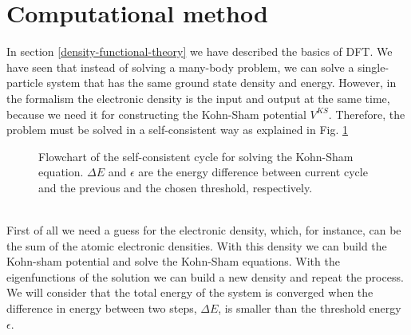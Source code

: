 \section{Computational method}

In section \ref{density-functional-theory} we have described the basics of DFT. We have seen that instead of solving a many-body problem, we can solve a single-particle system that has the same ground state density and 
energy. However, in the formalism the electronic density is the input and output at the same time, because we need it for constructing the Kohn-Sham potential $V^{KS}$. Therefore, the problem must be solved in a 
self-consistent way as explained in Fig. \ref{self-consistent-cycle} 
\begin{figure}[h]
\begin{center}
\end{center}
\caption[DFT self-consistent cycle]{Flowchart of the self-consistent cycle for solving the Kohn-Sham equation. $\Delta E$ and $\epsilon$ are the energy difference between current cycle and the previous and the chosen threshold, respectively.}
\label{self-consistent-cycle}
\end{figure}
\\

First of all we need a guess for the electronic density, which, for instance, can be the sum of the atomic electronic densities. With this density we can build the 
Kohn-sham potential and solve the Kohn-Sham equations. With the eigenfunctions of the solution we can build a new density and repeat the process. We will consider that the total energy of the system is converged when 
the difference in energy between two steps, $\Delta E$, is smaller than the threshold energy $\epsilon$. \\

